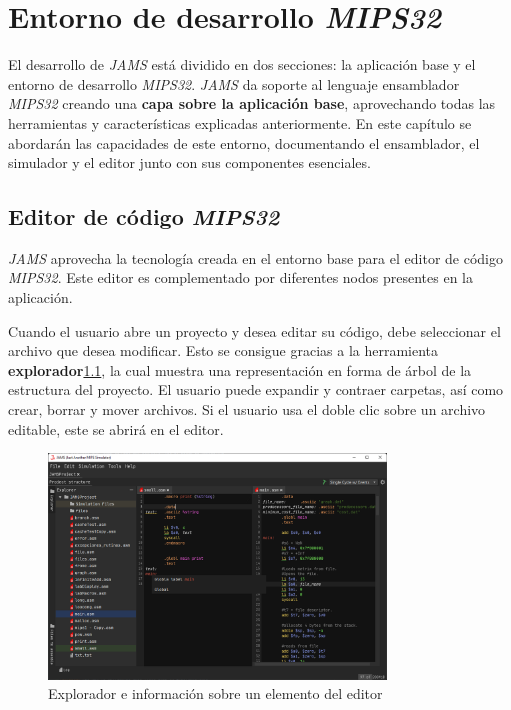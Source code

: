 \chapter{Entorno de desarrollo \textit{MIPS32}}\label{ch:entorno-de-desarrollo-mips32}

El desarrollo de \textit{JAMS} está dividido en dos secciones:
la aplicación base y el entorno de desarrollo \textit{MIPS32}.
\textit{JAMS} da soporte al lenguaje ensamblador \textit{MIPS32}
creando una \textbf{capa sobre la aplicación base},
aprovechando todas las herramientas y características explicadas anteriormente.
En este capítulo se abordarán las capacidades de este entorno,
documentando el ensamblador, el simulador y el editor junto
con sus componentes esenciales.


\section{Editor de código \textit{MIPS32}}\label{sec:editor-de-codigo-mips32}

\textit{JAMS} aprovecha la tecnología creada en el entorno base
para el editor de código \textit{MIPS32}.
Este editor es complementado por diferentes nodos presentes en la
aplicación.

Cuando el usuario abre un proyecto y desea editar su código,
debe seleccionar el archivo que desea modificar.
Esto se consigue gracias a la herramienta \textbf{explorador}\ref{fig:jams-explorer-text-hover}, la cual
muestra una representación en forma de árbol de la estructura del proyecto.
El usuario puede expandir y contraer carpetas, así como crear, borrar y
mover archivos.
Si el usuario usa el doble clic sobre un archivo editable, este se abrirá
en el editor.

\begin{figure}[h]
    \centering
    \includegraphics[width=0.8\textwidth]{images/mips/jams-text-hover}
    \caption{Explorador e información sobre un elemento del editor}
    \label{fig:jams-explorer-text-hover}
\end{figure}


